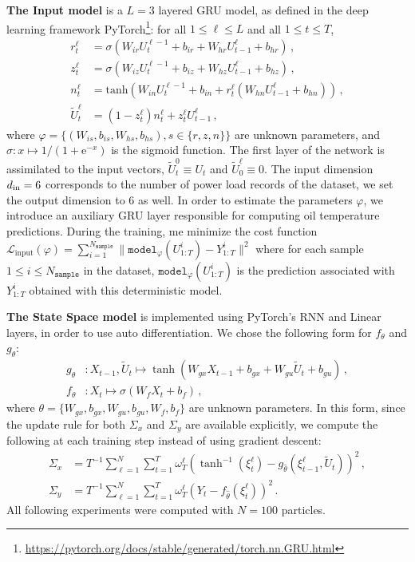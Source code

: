 \documentclass[journal]{IEEEtran}
\begin{document}
\textbf{The Input model} is a $L=3$ layered GRU model, as defined in the deep learning framework PyTorch\footnote{\href{https://pytorch.org/docs/stable/generated/torch.nn.GRU.html}{https://pytorch.org/docs/stable/generated/torch.nn.GRU.html}}: for all $1 \leq \ell \leq L$ and all $1 \leq t \leq T$,
\begin{align*}
	r^\ell_t        & = \sigma(W_{ir} U^{\ell - 1}_t + b_{ir} + W_{hr} U^{\ell}_{t-1} + b_{hr}) \,,                \\
	z^\ell_t        & = \sigma(W_{iz} U^{\ell - 1}_t + b_{iz} + W_{hz} U^{\ell}_{t-1} + b_{hz}) \,,                \\
	n^\ell_t        & = \mathrm{tanh}(W_{in} U^{\ell - 1}_t + b_{in} + r^\ell_t (W_{hn} U^\ell_{t-1} + b_{hn}))\,, \\
	\tilde U^\ell_t & = (1-z^\ell_t) n^\ell_t+z^\ell_t U^\ell_{t-1}\,,
\end{align*}
where $\varphi = \{(W_{is}, b_{is}, W_{hs}, b_{hs}), s \in \{r, z, n\}\}$ are unknown parameters, and $\sigma: x \mapsto 1/(1+\mathrm{e}^{-x})$ is the sigmoid function.
The first layer of the network is assimilated to the input vectors, $\widetilde U_t^0 \equiv U_t$ and $\widetilde U^\ell_0 \equiv 0$.
The input dimension $d_\textnormal{in}=6$ corresponds to the number of power load records of the dataset, we set the output dimension to 6 as well.
In order to estimate the parameters $\varphi$, we introduce an auxiliary GRU layer responsible for computing oil temperature predictions.
During the training, me minimize the cost function $\mathcal{L}_{\mathrm{input}}(\varphi) = \sum_{i=1}^{N_{\texttt{sample}}} \|\texttt{model}_{\varphi}(U^i_{1:T}) - Y^i_{1:T}\|^2$ where for each sample $1 \leq i \leq N_{\texttt{sample}}$ in the dataset, $\texttt{model}_\varphi(U^i_{1:T})$ is the prediction associated with $Y^i_{1:T}$ obtained with this deterministic model.

\textbf{The State Space model} is implemented using PyTorch's RNN and Linear layers, in order to use auto differentiation.
We chose the following form for $f_\theta$ and $g_\theta$:
\begin{align*}
	g_\theta & : X_{t-1}, \widetilde U_t \mapsto \tanh(W_{gx} X_{t-1} + b_{gx} + W_{gu} \widetilde U_t + b_{gu})\,, \\
	f_\theta & : X_t \mapsto  \sigma(W_f X_t + b_f)\,,
\end{align*}
where $\theta = \{W_{gx}, b_{gx}, W_{gu}, b_{gu}, W_f, b_f\}$ are unknown parameters.
In this form, since the update rule for both $\Sigma_x$ and $\Sigma_y$ are available explicitly, we compute the following at each training step instead of using gradient descent:
\begin{align*}
	\Sigma_x & = T^{-1} \sum_{\ell=1}^N \sum_{t=1}^T \omega_T^\ell (\tanh^{-1}(\xi_t^\ell) - g_{\hat \theta}(\xi^\ell_{t-1}, \widetilde U_t))^2\,, \\
	\Sigma_y & = T^{-1} \sum_{\ell=1}^N \sum_{t=1}^T \omega_T^\ell (Y_t - f_{\hat \theta}(\xi^\ell_t))^2 \,.
\end{align*}
All following experiments were computed with $N=100$ particles.
\end{document}
